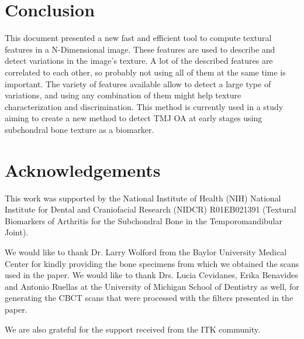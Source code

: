 \documentclass{InsightArticle}
\begin{document}
\newpage
\section{Conclusion}
\label{sec:conclusions}

This document presented a new fast and efficient tool to compute textural features in a  N-Dimensional image. These features are used to describe and detect variations in the image's texture. A lot of the described features are correlated to each other, so probably not using all of them at the same time is important. The variety of features available allow to detect a large type of variations, and using any combination of them might help texture characterization and discrimination. This method is currently used in a study aiming to create a new method to detect TMJ OA at early stages using subchondral bone texture as a biomarker.

\section*{Acknowledgements}

This work was supported by the National Institute of Health (NIH) National Institute for Dental and Craniofacial Research (NIDCR) R01EB021391 (Textural Biomarkers of Arthritis for the Subchondral Bone in the Temporomandibular Joint). 

We would like to thank Dr. Larry Wolford from the Baylor University Medical Center for kindly providing the bone specimens from which we obtained the scans used in the paper. We would like to thank Drs. Lucia Cevidanes, Erika Benavides and Antonio Ruellas at the University of Michigan School of Dentistry as well, for generating the CBCT scans that were processed with the filters presented in the paper.

We are also grateful for the support received from the ITK community.

%
%
\newpage


\end{document}
